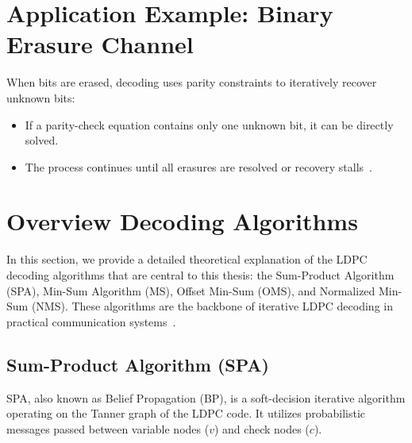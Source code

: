 \documentclass[../main.tex]{subfiles}
\begin{document}
\section{Application Example: Binary Erasure Channel}
When bits are erased, decoding uses parity constraints to iteratively recover unknown bits:
\begin{itemize}
    \item If a parity-check equation contains only one unknown bit, it can be directly solved.
    \item The process continues until all erasures are resolved or recovery stalls~\cite{Karthikeyan2020, Schmalen2021}.
\end{itemize}


\section{Overview Decoding Algorithms}
\label{sec:decoding_algorithms}

% 


% 


In this section, we provide a detailed theoretical explanation of the LDPC decoding algorithms that are central to this thesis: the Sum-Product Algorithm (SPA), Min-Sum Algorithm (MS), Offset Min-Sum (OMS), and Normalized Min-Sum (NMS). These algorithms are the backbone of iterative LDPC decoding in practical communication systems~\cite{Karthikeyan2020, Schmalen2021, Condo2019}.

\subsection{Sum-Product Algorithm (SPA)}

SPA, also known as Belief Propagation (BP), is a soft-decision iterative algorithm operating on the Tanner graph of the LDPC code. It utilizes probabilistic messages passed between variable nodes ($v$) and check nodes ($c$).
\end{document}
